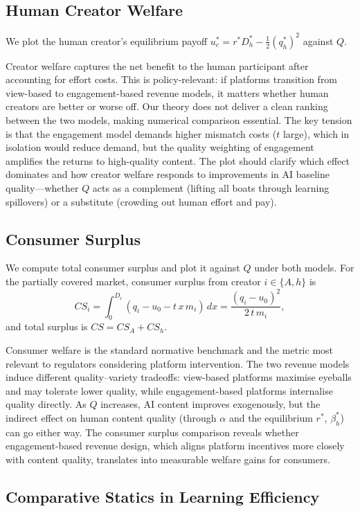 \documentclass[mnsc,nonblindrev]{informs3_NoOR}
\begin{document}
\subsection{Human Creator Welfare}
 
We plot the human creator's equilibrium payoff $u_c^* = r^* D_h^* - \frac{1}{2}(q_h^*)^2$ against $Q$.
 
Creator welfare captures the net benefit to the human participant after accounting for effort costs. This is policy-relevant: if platforms transition from view-based to engagement-based revenue models, it matters whether human creators are better or worse off. Our theory does not deliver a clean ranking between the two models, making numerical comparison essential. The key tension is that the engagement model demands higher mismatch costs ($t$ large), which in isolation would reduce demand, but the quality weighting of engagement amplifies the returns to high-quality content. The plot should clarify which effect dominates and how creator welfare responds to improvements in AI baseline quality---whether $Q$ acts as a complement (lifting all boats through learning spillovers) or a substitute (crowding out human effort and pay).
 
\subsection{Consumer Surplus}
 
We compute total consumer surplus and plot it against $Q$ under both models. For the partially covered market, consumer surplus from creator $i \in \{A, h\}$ is
\[
CS_i = \int_0^{D_i} (q_i - u_0 - t\,x\,m_i)\,dx = \frac{(q_i - u_0)^2}{2\,t\,m_i},
\]
and total surplus is $CS = CS_A + CS_h$.
 
Consumer welfare is the standard normative benchmark and the metric most relevant to regulators considering platform intervention. The two revenue models induce different quality--variety tradeoffs: view-based platforms maximise eyeballs and may tolerate lower quality, while engagement-based platforms internalise quality directly. As $Q$ increases, AI content improves exogenously, but the indirect effect on human content quality (through $\alpha$ and the equilibrium $r^*$, $\beta_h^*$) can go either way. The consumer surplus comparison reveals whether engagement-based revenue design, which aligns platform incentives more closely with content quality, translates into measurable welfare gains for consumers.
 
\subsection{Comparative Statics in Learning Efficiency}
 
\end{document}
